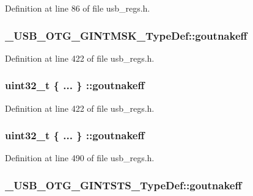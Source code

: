 Definition at line 86 of file usb\-\_\-regs.\-h.

\hypertarget{group___u_s_b___o_t_g___d_r_i_v_e_r_gac1246a6e7449fa058ef2be6ef623d06b}{
\subsubsection[{goutnakeff}]{ \-\_\-\-U\-S\-B\-\_\-\-O\-T\-G\-\_\-\-G\-I\-N\-T\-M\-S\-K\-\_\-\-Type\-Def\-::goutnakeff}}\label{group___u_s_b___o_t_g___d_r_i_v_e_r_gac1246a6e7449fa058ef2be6ef623d06b}


Definition at line 422 of file usb\-\_\-regs.\-h.

\hypertarget{group___u_s_b___o_t_g___d_r_i_v_e_r_gaa5c05d45d794e6477ddb274dce4572d8}{
\subsubsection[{goutnakeff}]{\setlength{\rightskip}{0pt plus 5cm}uint32\-\_\-t \{ ... \} \-::goutnakeff}}\label{group___u_s_b___o_t_g___d_r_i_v_e_r_gaa5c05d45d794e6477ddb274dce4572d8}


Definition at line 422 of file usb\-\_\-regs.\-h.

\hypertarget{group___u_s_b___o_t_g___d_r_i_v_e_r_ga17dd5b71bb279af9e50290d383db4971}{
\subsubsection[{goutnakeff}]{\setlength{\rightskip}{0pt plus 5cm}uint32\-\_\-t \{ ... \} \-::goutnakeff}}\label{group___u_s_b___o_t_g___d_r_i_v_e_r_ga17dd5b71bb279af9e50290d383db4971}


Definition at line 490 of file usb\-\_\-regs.\-h.

\hypertarget{group___u_s_b___o_t_g___d_r_i_v_e_r_ga141b86207565280b9a5e54a41ced9ff8}{
\subsubsection[{goutnakeff}]{ \-\_\-\-U\-S\-B\-\_\-\-O\-T\-G\-\_\-\-G\-I\-N\-T\-S\-T\-S\-\_\-\-Type\-Def\-::goutnakeff}}\label{group___u_s_b___o_t_g___d_r_i_v_e_r_ga141b86207565280b9a5e54a41ced9ff8}


